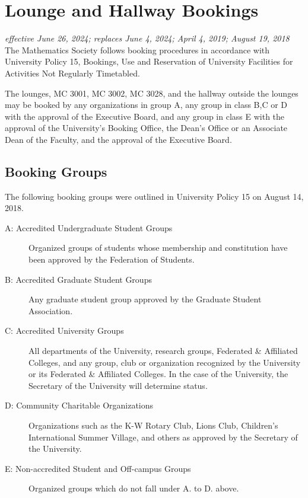\section{Lounge and Hallway Bookings}
\emph{effective June 26, 2024; replaces June 4, 2024; April 4, 2019; August 19, 2018}\\

The Mathematics Society follows booking procedures in accordance with
University Policy 15, Bookings, Use and Reservation of University Facilities
for Activities Not Regularly Timetabled.

The lounges, MC 3001, MC 3002, MC 3028, and the hallway outside the lounges may be
booked by any organizations in group A, any group in class B,C or D with the approval of the Executive Board, and any group in class E with the approval of the University’s Booking Office, the Dean’s Office or an Associate Dean of the Faculty, and the approval of the Executive Board.

\subsection{Booking Groups}

The following booking groups were outlined in University Policy 15 on
August 14, 2018.

\begin{description}
	\item[A: Accredited Undergraduate Student Groups] Organized groups of students
		whose membership and constitution have been approved by the Federation of
		Students.

	\item[B: Accredited Graduate Student Groups] Any graduate student group
		approved by the Graduate Student Association.

	\item[C: Accredited University Groups] All departments of the University,
		research groups, Federated \& Affiliated Colleges, and any group, club or
		organization recognized by the University or its Federated \& Affiliated
		Colleges. In the case of the University, the Secretary of the University
		will determine status.

	\item[D: Community Charitable Organizations] Organizations such as the K-W
		Rotary Club, Lions Club, Children's International Summer Village, and
		others as approved by the Secretary of the University.

	\item[E: Non-accredited Student and Off-campus Groups] Organized groups which
		do not fall under A. to D. above.
\end{description}

